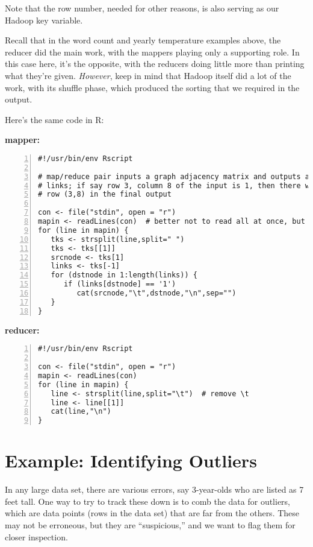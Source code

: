 Note that the row number, needed for other reasons, is also serving as
our Hadoop key variable.

Recall that in the word count and yearly temperature examples above, the
reducer did the main work, with the mappers playing only a supporting
role.  In this case here, it's the opposite, with the reducers doing
little more than printing what they're given.  {\it However}, keep in
mind that Hadoop itself did a lot of the work, with its shuffle phase,
which produced the sorting that we required in the output.

Here's the same code in R:

{\bf mapper:}

\begin{lstlisting}[numbers=left]
#!/usr/bin/env Rscript

# map/reduce pair inputs a graph adjacency matrix and outputs a list of
# links; if say row 3, column 8 of the input is 1, then there will be a
# row (3,8) in the final output
 
con <- file("stdin", open = "r") 
mapin <- readLines(con)  # better not to read all at once, but keep simple
for (line in mapin) {
   tks <- strsplit(line,split=" ")
   tks <- tks[[1]]
   srcnode <- tks[1]
   links <- tks[-1]
   for (dstnode in 1:length(links)) {
      if (links[dstnode] == '1')  
         cat(srcnode,"\t",dstnode,"\n",sep="")
   }
}
\end{lstlisting}

{\bf reducer:}

\begin{lstlisting}[numbers=left]
#!/usr/bin/env Rscript

con <- file("stdin", open = "r") 
mapin <- readLines(con)
for (line in mapin) {
   line <- strsplit(line,split="\t")  # remove \t
   line <- line[[1]]
   cat(line,"\n")
}
\end{lstlisting}

\section{Example:  Identifying Outliers}

In any large data set, there are various errors, say 3-year-olds who are
listed as 7 feet tall. One way to try to track these down is to comb the
data for outliers, which are data points (rows in the data set) that are
far from the others. These may not be erroneous, but they are
``suspicious,'' and we want to flag them for closer inspection.

